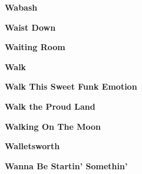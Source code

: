 \newline
\vspace{10pt} 
\begin{center}\textbf{Wabash}\end{center}
\newline
\vspace{10pt} 
\begin{center}\textbf{Waist Down}\end{center}
\newline
\vspace{10pt} 
\begin{center}\textbf{Waiting Room}\end{center}
\newline
\vspace{10pt} 
\begin{center}\textbf{Walk}\end{center}
\newline
\vspace{10pt} 
\begin{center}\textbf{Walk This Sweet Funk Emotion}\end{center}
\newline
\vspace{10pt} 
\begin{center}\textbf{Walk the Proud Land}\end{center}
\newline
\vspace{10pt} 
\begin{center}\textbf{Walking On The Moon}\end{center}
\newline
\vspace{10pt} 
\begin{center}\textbf{Walletsworth}\end{center}
\newline
\vspace{10pt} 
\begin{center}\textbf{Wanna Be Startin' Somethin'}\end{center}
\newline
\vspace{10pt} 
